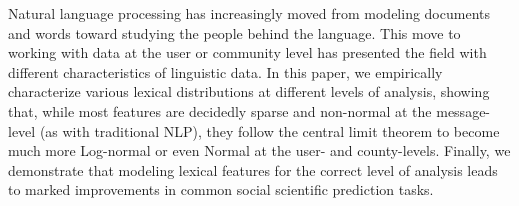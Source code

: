 Natural language processing has increasingly moved from modeling documents and words toward studying the people behind the language. This move to working with data at the user or community level has presented the field with different characteristics of linguistic data. In this paper, we empirically characterize various lexical distributions at different levels of analysis, showing that, while most features are decidedly sparse and non-normal at the message-level (as with traditional NLP), they follow the central limit theorem to become much more Log-normal or even Normal at the user- and county-levels. Finally, we demonstrate that modeling lexical features for the correct level of analysis leads to marked improvements in common social scientific prediction tasks.
